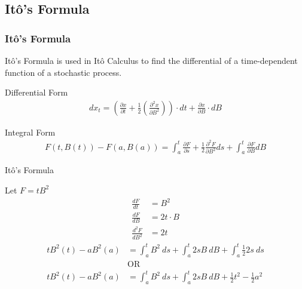 
\subsection{It\^o's Formula}

\begin{frame}
\frametitle{It\^o's Formula}
It\^o's Formula is used in It\^o Calculus to find the differential of a time-dependent function of a stochastic process.
\vfill

		 \begin{block}{Differential Form}
      \begin{align*}
				\displaystyle dx_t =\left(\frac{\partial x}{\partial t} + \frac{1}{2} \left(\frac{\partial ^2 x}{\partial B ^2}\right)\right) \cdot  dt + \frac{\partial x}{\partial B} \cdot dB 
			\end{align*}
    \end{block}
		
\vfill

		\begin{block}{Integral Form}
      \begin{align*}
				\displaystyle F(t, B(t))-F(a,B(a))=
 \int_{a}^{t} \frac{\partial F}{\partial s} + \frac{1}{2} \frac{\partial^2 F}{\partial B^2}ds+
 \int_a^t \frac{\partial F}{\partial B} dB
			\end{align*}
    \end{block}

\vfill
\end{frame}

\begin{frame}{It\^o's Formula} 

Let $F=tB^2$ 
\begin{align*}
\displaystyle
\frac{dF}{dt}&= B^2\\
\frac{dF}{dB}&=2t \cdot B\\ 
\frac{d^2 F}{dB^2}&=2t
\end{align*}
\begin{align*}
tB^2(t)-aB^2(a) &=\int_{a}^{t}B^2 ~ ds+ \int_{a}^{t}2sB ~ dB+\int_a^t \frac{1}{2}2s ~ ds\\
 &\text{OR}\\
tB^2(t)-aB^2(a) &= \int_a^t B^2 ~ ds+ \int_a^t 2sB ~ dB+ \frac{1}{2} t^2- \frac{1}{2}a^2
\end{align*}
\end{frame}

